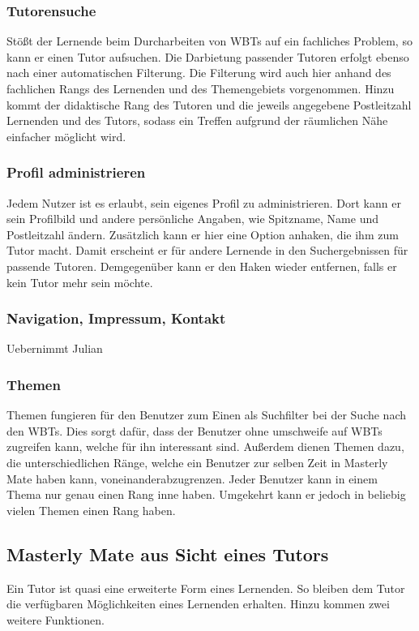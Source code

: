 \subsubsection{Tutorensuche}
Stößt der Lernende beim Durcharbeiten von WBTs auf ein fachliches Problem, so
kann er einen Tutor aufsuchen. Die Darbietung passender Tutoren erfolgt ebenso
nach einer automatischen Filterung. Die Filterung wird auch hier anhand des
fachlichen Rangs des Lernenden und des Themengebiets vorgenommen. Hinzu kommt
der didaktische Rang des Tutoren und die jeweils angegebene Postleitzahl
Lernenden und des Tutors, sodass ein Treffen aufgrund der räumlichen Nähe
einfacher möglicht wird.

\subsubsection{Profil administrieren}
Jedem Nutzer ist es erlaubt, sein eigenes Profil zu administrieren. Dort kann er
sein Profilbild und andere persönliche Angaben, wie Spitzname, Name und
Postleitzahl ändern. Zusätzlich kann er hier eine Option anhaken, die ihm zum
Tutor macht. Damit erscheint er für andere Lernende in den Suchergebnissen für
passende Tutoren. Demgegenüber kann er den Haken wieder entfernen, falls er kein
Tutor mehr sein möchte.

\subsubsection{Navigation, Impressum, Kontakt}
\begin{k}
Uebernimmt Julian
\end{k}

\subsubsection{Themen}
Themen fungieren für den Benutzer zum Einen als Suchfilter bei der Suche nach
den WBTs. Dies sorgt dafür, dass der Benutzer ohne umschweife auf WBTs zugreifen
kann, welche für ihn interessant sind. Außerdem dienen Themen dazu, die
unterschiedlichen Ränge, welche ein Benutzer zur selben Zeit in Masterly Mate
haben kann, voneinanderabzugrenzen. Jeder Benutzer kann in einem Thema nur genau
einen Rang inne haben. Umgekehrt kann er jedoch in beliebig vielen Themen einen
Rang haben.

\subsection{Masterly Mate aus Sicht eines Tutors}
Ein Tutor ist quasi eine erweiterte Form eines Lernenden. So bleiben dem Tutor
die verfügbaren Möglichkeiten eines Lernenden erhalten. Hinzu kommen zwei
weitere Funktionen.

